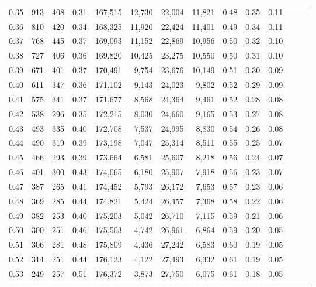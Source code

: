 \begin{tabular}{rrrrrrrrrrrrrr}
0.35 &     913 &  408 &  0.31 &  167,515 &   12,730 &  22,004 &  11,821 &  0.48 &  0.35 &      0.11 \\
0.36 &     810 &  420 &  0.34 &  168,325 &   11,920 &  22,424 &  11,401 &  0.49 &  0.34 &      0.11 \\
0.37 &     768 &  445 &  0.37 &  169,093 &   11,152 &  22,869 &  10,956 &  0.50 &  0.32 &      0.10 \\
0.38 &     727 &  406 &  0.36 &  169,820 &   10,425 &  23,275 &  10,550 &  0.50 &  0.31 &      0.10 \\
0.39 &     671 &  401 &  0.37 &  170,491 &    9,754 &  23,676 &  10,149 &  0.51 &  0.30 &      0.09 \\
0.40 &     611 &  347 &  0.36 &  171,102 &    9,143 &  24,023 &   9,802 &  0.52 &  0.29 &      0.09 \\
0.41 &     575 &  341 &  0.37 &  171,677 &    8,568 &  24,364 &   9,461 &  0.52 &  0.28 &      0.08 \\
0.42 &     538 &  296 &  0.35 &  172,215 &    8,030 &  24,660 &   9,165 &  0.53 &  0.27 &      0.08 \\
0.43 &     493 &  335 &  0.40 &  172,708 &    7,537 &  24,995 &   8,830 &  0.54 &  0.26 &      0.08 \\
0.44 &     490 &  319 &  0.39 &  173,198 &    7,047 &  25,314 &   8,511 &  0.55 &  0.25 &      0.07 \\
0.45 &     466 &  293 &  0.39 &  173,664 &    6,581 &  25,607 &   8,218 &  0.56 &  0.24 &      0.07 \\
0.46 &     401 &  300 &  0.43 &  174,065 &    6,180 &  25,907 &   7,918 &  0.56 &  0.23 &      0.07 \\
0.47 &     387 &  265 &  0.41 &  174,452 &    5,793 &  26,172 &   7,653 &  0.57 &  0.23 &      0.06 \\
0.48 &     369 &  285 &  0.44 &  174,821 &    5,424 &  26,457 &   7,368 &  0.58 &  0.22 &      0.06 \\
0.49 &     382 &  253 &  0.40 &  175,203 &    5,042 &  26,710 &   7,115 &  0.59 &  0.21 &      0.06 \\
0.50 &     300 &  251 &  0.46 &  175,503 &    4,742 &  26,961 &   6,864 &  0.59 &  0.20 &      0.05 \\
0.51 &     306 &  281 &  0.48 &  175,809 &    4,436 &  27,242 &   6,583 &  0.60 &  0.19 &      0.05 \\
0.52 &     314 &  251 &  0.44 &  176,123 &    4,122 &  27,493 &   6,332 &  0.61 &  0.19 &      0.05 \\
0.53 &     249 &  257 &  0.51 &  176,372 &    3,873 &  27,750 &   6,075 &  0.61 &  0.18 &      0.05 \\

\end{tabular}
